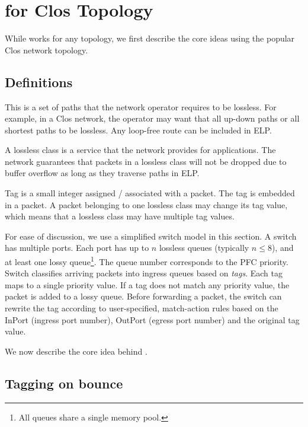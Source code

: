 \section{\sysname{} for Clos Topology}
\label{sec:specific}

While \sysname{} works for any topology, we first describe the core ideas using
the popular Clos network topology.

\subsection {Definitions}

 This is a set of paths that the network
operator requires to be lossless. For example, in a Clos network, the operator
may want that all up-down paths or all shortest paths to be lossless.  Any
loop-free route can be included in ELP.

 A lossless class is a service that the network provides for
applications. The network guarantees that packets in a lossless class will not
be dropped due to buffer overflow as long as they traverse paths in ELP.

 Tag is a small integer assigned / associated with a packet. The tag
is embedded in a packet. A packet belonging to one lossless class may change its
tag value, which means that a lossless class may have multiple tag values.

 For ease of discussion, we use a simplified
switch model in this section.  A switch has multiple ports. Each port
has up to $n$ lossless queues (typically $n\leq8$), and at least one
lossy queue\footnote{All queues share a single memory pool.}. The queue
number corresponds to the PFC priority. Switch classifies arriving
packets into ingress queues based on {\em tags}. Each tag maps to a
single priority value. If a tag does not match any priority value, the
packet is added to a lossy queue. Before forwarding a packet, the
switch can rewrite the tag according to user-specified, match-action
rules based on the InPort (ingress port number), OutPort (egress port number)
and the original tag value.

We now describe the core idea behind \sysname{}.

\subsection{Tagging on bounce}
\label{subsec:tag}

